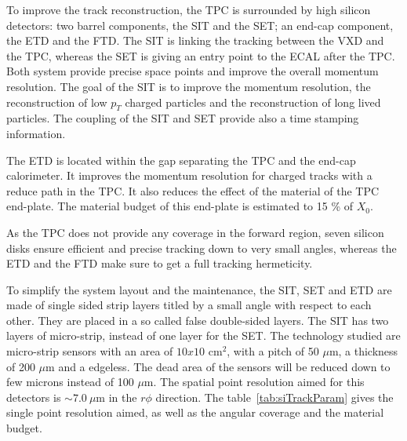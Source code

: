       To improve the track reconstruction, the \gls{TPC} is surrounded by high silicon detectors: two barrel components, the \gls{SIT} and the \gls{SET}; an end-cap component, the \gls{ETD} and the \gls{FTD}.
      The \gls{SIT} is linking the tracking between the \gls{VXD} and the \gls{TPC}, whereas the \gls{SET} is giving an entry point to the \gls{ECAL} after the \gls{TPC}.
      Both system provide precise space points and improve the overall momentum resolution.
      The goal of the \gls{SIT} is to improve the momentum resolution, the reconstruction of low $p_{T}$ charged particles and the reconstruction of long lived particles.
      The coupling of the \gls{SIT} and \gls{SET} provide also a time stamping information.

      The \gls{ETD} is located within the gap separating the \gls{TPC} and the end-cap calorimeter. 
      It improves the momentum resolution for charged tracks with a reduce path in the \gls{TPC}.
      It also reduces the effect of the material of the \gls{TPC} end-plate. 
      The material budget of this end-plate is estimated to 15 \% of $X_0$.

      As the \gls{TPC} does not provide any coverage in the forward region, seven silicon disks ensure efficient and precise tracking down to very small angles, whereas the \gls{ETD} and the \gls{FTD} make sure to get a full tracking hermeticity.

      To simplify the system layout and the maintenance, the \gls{SIT}, \gls{SET} and \gls{ETD} are made of single sided strip layers titled by a small angle with respect to each other. 
      They are placed in a so called false double-sided layers.
      The \gls{SIT} has two layers of micro-strip, instead of one layer for the \gls{SET}. 
      The technology studied are micro-strip sensors with an area of $10x10 \text{ cm}^2$, with a pitch of 50 $\mu$m, a thickness of 200 $\mu$m and a edgeless.
      The dead area of the sensors will be reduced down to few microns instead of 100 $\mu$m.
      The spatial point resolution aimed for this detectors is $\sim 7.0 \ \mu$m in the $r\phi$ direction.
      The table~\ref{tab:siTrackParam} gives the single point resolution aimed, as well as the angular coverage and the material budget.

